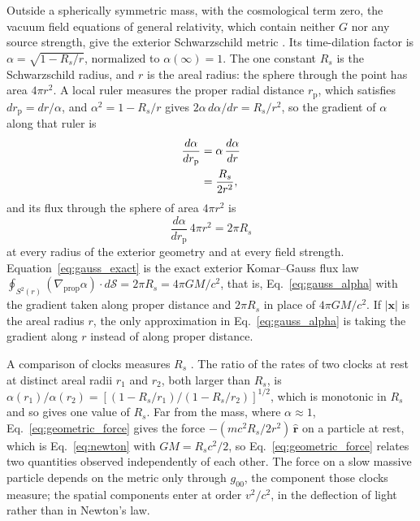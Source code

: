\documentclass[aps,prd,onecolumn,tightenlines,nofootinbib,notitlepage,11pt,floatfix]{revtex4-2}
\theoremstyle{indentedtheorem}
\begin{document}
Outside a spherically symmetric mass, with the cosmological term zero, the vacuum field equations of general relativity, which contain neither $G$ nor any source strength, give the exterior Schwarzschild metric \citep{Schwarzschild1916Metric,MTW1973Gravitation}. Its time-dilation factor is $\alpha=\sqrt{1-R_s/r}$, normalized to $\alpha(\infty)=1$. The one constant $R_s$ is the Schwarzschild radius, and $r$ is the areal radius: the sphere through the point has area $4\pi r^2$. A local ruler measures the proper radial distance $r_\text{p}$, which satisfies $dr_\text{p}=dr/\alpha$, and $\alpha^2=1-R_s/r$ gives $2\alpha\,d\alpha/dr=R_s/r^2$, so the gradient of $\alpha$ along that ruler is
\begin{align}
    \frac{d\alpha}{dr_\text{p}} &= \alpha \, \frac{d\alpha}{dr} \notag\\
    &= \frac{R_s}{2r^2} ,
    \label{eq:dalpha_dl}
\end{align}
and its flux through the sphere of area $4\pi r^2$ is
\begin{equation}
    \frac{d\alpha}{dr_\text{p}} \, 4\pi r^2 = 2\pi R_s
    \label{eq:gauss_exact}
\end{equation}
at every radius of the exterior geometry and at every field strength. Equation~\eqref{eq:gauss_exact} is the exact exterior Komar--Gauss flux law $\oint_{S^2(r)}(\nabla_\text{prop}\alpha)\cdot d\boldsymbol{\mathcal{S}} = 2\pi R_s = 4\pi GM/c^2$, that is, Eq.~\eqref{eq:gauss_alpha} with the gradient taken along proper distance and $2\pi R_s$ in place of $4\pi GM/c^2$. If $|\mathbf{x}|$ is the areal radius $r$, the only approximation in Eq.~\eqref{eq:gauss_alpha} is taking the gradient along $r$ instead of along proper distance.

A comparison of clocks measures $R_s$ \citep{Pound1960Apparent,Bothwell2022Resolving}. The ratio of the rates of two clocks at rest at distinct areal radii $r_1$ and $r_2$, both larger than $R_s$, is $\alpha(r_1)/\alpha(r_2)=[(1-R_s/r_1)/(1-R_s/r_2)]^{1/2}$, which is monotonic in $R_s$ and so gives one value of $R_s$. Far from the mass, where $\alpha\approx1$, Eq.~\eqref{eq:geometric_force} gives the force $-(mc^2R_s/2r^2)\,\hat{\mathbf{r}}$ on a particle at rest, which is Eq.~\eqref{eq:newton} with $GM=R_sc^2/2$, so Eq.~\eqref{eq:geometric_force} relates two quantities observed independently of each other. The force on a slow massive particle depends on the metric only through $g_{00}$, the component those clocks measure; the spatial components enter at order $v^2/c^2$, in the deflection of light rather than in Newton's law.
\end{document}
